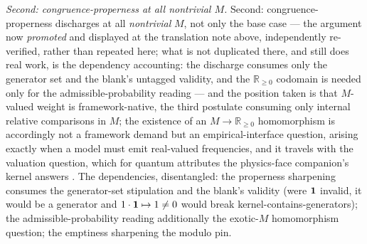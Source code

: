 
\textit{Second: congruence-properness at all nontrivial $M$.} Second: congruence-properness discharges at all \emph{nontrivial} $M$, not only the base case --- the argument now \emph{promoted} and displayed at the translation note above, independently re-verified, rather than repeated here; what is not duplicated there, and still does real work, is the dependency accounting: the discharge consumes only the generator set and the blank's untagged validity, and the $\mathbb{R}_{\geq 0}$ codomain is needed only for the admissible-probability reading --- and the position taken is that $M$-valued weight is framework-native, the third postulate consuming only internal relative comparisons in $M$; the existence of an $M \to \mathbb{R}_{\geq 0}$ homomorphism is accordingly not a framework demand but an empirical-interface question, arising exactly when a model must emit real-valued frequencies, and it travels with the valuation question, which for quantum attributes the physics-face companion's kernel answers \cite{AethusQuant}. The dependencies, disentangled: the properness sharpening consumes the generator-set stipulation and the blank's validity (were $\mathbf{1}$ invalid, it would be a generator and $1 \cdot \mathbf{1} \mapsto 1 \neq 0$ would break kernel-contains-generators); the admissible-probability reading additionally the exotic-$M$ homomorphism question; the emptiness sharpening the modulo pin.

